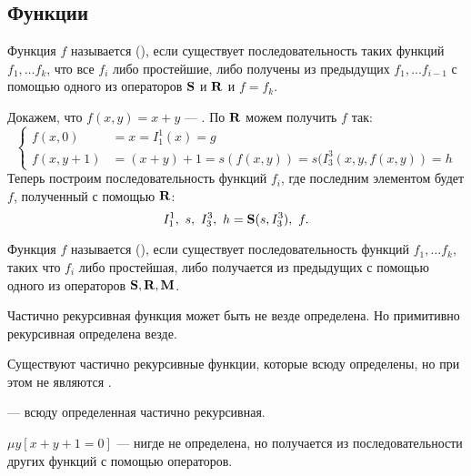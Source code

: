 \subsection{Функции}
\begin{defn}
	Функция $ f$ называется  (\prf),
	если 
	существует последовательность таких функций  $ f_1, \ldots f_k$, что
	все $ f_i$ либо простейшие, либо получены из предыдущих $ f_1, \ldots f_{i-1}$ с помощью одного из операторов $\S$ и $\R$ и $ f = f_k$.
\end{defn}


\begin{ex}\label{ex:1}
	Докажем, что $ f(x, y) = x + y$ --- \prf. По  $ \R$ можем получить $ f$ так:
	\[
	\begin{cases}
		f(x, 0) &= x = I^{1}_{1} (x) =g \\
		f(x, y+1) &= (x + y) + 1 = s(f(x, y)) = s(I^{3}_{3} (x, y, f(x, y)) = h 
	\end{cases}
	\] 
	Теперь построим последовательность функций $ f_i$, где последним элементом будет $ f$, полученный с помощью $ \R$: 
	\[
		I^{1}_{1} , ~s, ~I^{3}_{3} , ~ h = \S(s, I^{3}_{3}) ,~ f
	.\] 
\end{ex}


\begin{defn}
	Функция $ f$ называется  (\crf), если существует последовательность функций $ f_1, \ldots f_k$, таких что $ f_i$ либо простейшая, либо получается из предыдущих с помощью одного из операторов  $ \S, \R, \M$.
\end{defn}

\begin{note}
    Частично рекурсивная функция может быть не везде определена. Но примитивно рекурсивная определена везде.
\end{note}
\begin{note}
    Существуют частично рекурсивные функции, которые всюду определены, но при этом не являются \prf.
\end{note}

\begin{defn}
	 --- всюду определенная частично рекурсивная.
\end{defn}


\begin{ex}
	$ \mu y [x + y + 1 = 0]$ --- нигде не определена, но получается из последовательности других функций с помощью операторов.
\end{ex}



